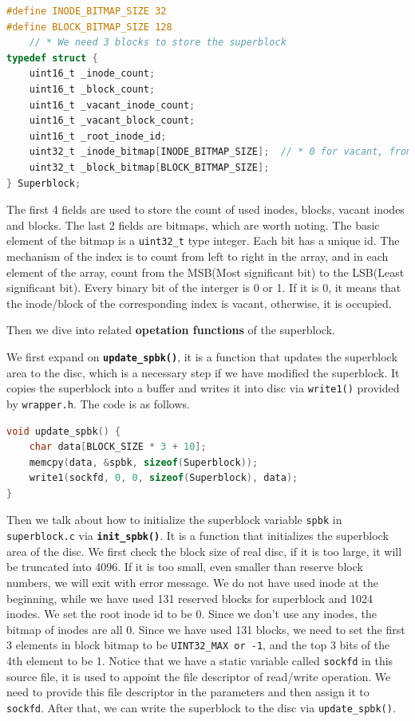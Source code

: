 \begin{lstlisting}[language=C]
#define INODE_BITMAP_SIZE 32
#define BLOCK_BITMAP_SIZE 128
    // * We need 3 blocks to store the superblock
typedef struct {
    uint16_t _inode_count;
    uint16_t _block_count;
    uint16_t _vacant_inode_count;
    uint16_t _vacant_block_count;
    uint16_t _root_inode_id;
    uint32_t _inode_bitmap[INODE_BITMAP_SIZE];  // * 0 for vacant, from left to right
    uint32_t _block_bitmap[BLOCK_BITMAP_SIZE];
} Superblock;
\end{lstlisting}

The first 4 fields are used to store the count of used inodes, blocks, vacant inodes and blocks. 
The last 2 fields are bitmaps, which are worth noting. The basic element of the bitmap is a \texttt{uint32\_t} type integer.
Each bit has a unique id. The mechanism of the index is to count from left to right in the array, and in each element of the array, count from the 
MSB(Most significant bit) to the LSB(Least significant bit). Every binary bit of the interger is 0 or 1. If it is 0, it means that the inode/block of the corresponding index is vacant, otherwise, it is occupied.

Then we dive into related \textbf{opetation functions} of the superblock.

We first expand on \textbf{\texttt{update\_spbk()}}, it is a function that updates the superblock area to the disc, which is a necessary step if we have modified the superblock.
It copies the superblock into a buffer and writes it into disc via \texttt{write1()} provided by \texttt{wrapper.h}. The code is as follows.

\begin{lstlisting}[language=C]
void update_spbk() {
    char data[BLOCK_SIZE * 3 + 10];
    memcpy(data, &spbk, sizeof(Superblock));
    write1(sockfd, 0, 0, sizeof(Superblock), data);
}

\end{lstlisting}

Then we talk about how to initialize the superblock variable \texttt{spbk} in \texttt{superblock.c} via \textbf{\texttt{init\_spbk()}}. It is a function that initializes the superblock area of the disc.
We first check the block size of real disc, if it is too large, it will be truncated into 4096.
If it is too small, even smaller than reserve block numbers, we will exit with error message.
We do not have used inode at the beginning, while we have used 131 reserved blocks for superblock and 1024 inodes. We set the root inode id to be 0.
Since we don't use any inodes, the bitmap of inodes are all 0. Since we have used 131 blocks, 
we need to set the first 3 elements in block bitmap to be \texttt{UINT32_MAX or -1}, and the top 3 bits of the 4th element to be 1.
Notice that we have a static variable called \texttt{sockfd} in this source file, it is used to appoint the file descriptor of read/write operation. We need to 
provide this file descriptor in the parameters and then assign it to \texttt{sockfd}. After that, we can write the superblock to the disc via \texttt{update\_spbk()}.

